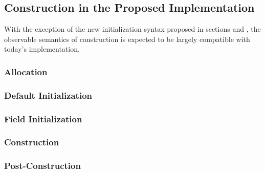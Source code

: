 \subsection{Construction in the Proposed Implementation}

With the exception of the new initialization syntax proposed in sections
 and , the observable semantics of construction is
expected to be largely compatible with today's implementation.  
\subsubsection{Allocation}

\subsubsection{Default Initialization}

\subsubsection{Field Initialization}

\subsubsection{Construction}

\subsubsection{Post-Construction}

